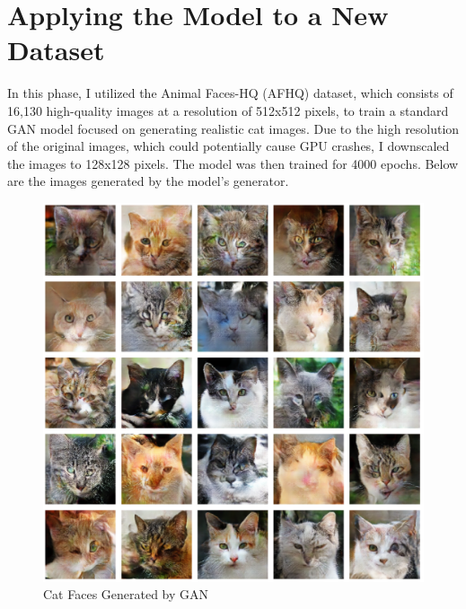 \section{Applying the Model to a New Dataset}
In this phase, I utilized the Animal Faces-HQ (AFHQ) dataset, which consists of 16,130 high-quality 
images at a resolution of 512x512 pixels, to train a standard GAN model focused on generating realistic 
cat images. Due to the high resolution of the original images, which could potentially cause GPU crashes, 
I downscaled the images to 128x128 pixels. The model was then trained for 4000 epochs. Below are the images 
generated by the model’s generator.


\begin{figure}[h]
    \centering
    \includegraphics[width=1.0\textwidth]{./Images/apply_new_dataset.jpg} 
    \caption{Cat Faces Generated by GAN}
    \label{fig:apply new dataset}
\end{figure}
